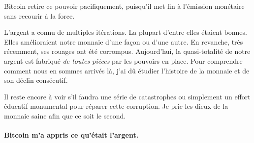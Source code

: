 Bitcoin retire ce pouvoir pacifiquement, puisqu'il met fin à l'émission
monétaire sans recourir à la force.

L'argent a connu de multiples itérations. La plupart d'entre elles étaient
bonnes. Elles amélioraient notre monnaie d'une façon ou d'une autre. En
revanche, très récemment, ses rouages ont été corrompus. Aujourd'hui, la
quasi-totalité de notre argent est fabriqué \textit{de toutes pièces} par les
pouvoirs en place. Pour comprendre comment nous en sommes arrivés là, j'ai dû
étudier l'histoire de la monnaie et de son déclin consécutif.

Il reste encore à voir s'il faudra une série de catastrophes ou simplement un
effort éducatif monumental pour réparer cette corruption. Je prie les dieux de
la monnaie saine afin que ce soit le second.

\paragraph{Bitcoin m'a appris ce qu'était l'argent.}

%
%
%
%
